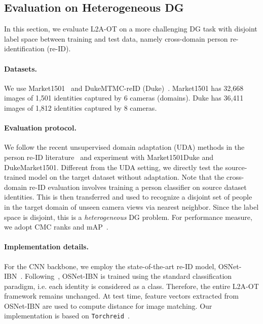 \documentclass[runningheads]{llncs}
\begin{document}
\subsection{Evaluation on Heterogeneous DG}
In this section, we evaluate L2A-OT on a more challenging DG task with disjoint label space between training and test data, namely cross-domain person re-identification (re-ID).

\paragraph{Datasets.}
We use Market1501~\cite{zheng2015scalable} and DukeMTMC-reID (Duke)~\cite{ristani2016perform,zheng2017unlabeled}. Market1501 has 32,668 images of 1,501 identities captured by 6 cameras (domains). Duke has 36,411 images of 1,812 identities captured by 8 cameras.

\paragraph{Evaluation protocol.}
We follow the recent unsupervised domain adaptation (UDA) methods in the person re-ID literature~\cite{zhong2018gen,zhong2019camstyle,liu2019adaptive} and experiment with Market1501Duke and DukeMarket1501. Different from the UDA setting, we directly test the source-trained model on the target dataset without adaptation. Note that the cross-domain re-ID evaluation involves training a person classifier on source dataset identities. This is then transferred and used to recognize a disjoint set of people in the target domain of unseen camera views via nearest neighbor. Since the label space is disjoint, this is a \emph{heterogeneous} DG problem. For performance measure, we adopt CMC ranks and mAP~\cite{zheng2015scalable}.

\paragraph{Implementation details.}
For the CNN backbone, we employ the state-of-the-art re-ID model, OSNet-IBN~\cite{zhou2019osnet,zhou2019learning}. Following~\cite{zhou2019osnet,zhou2019learning}, OSNet-IBN is trained using the standard classification paradigm, i.e. each identity is considered as a class. Therefore, the entire L2A-OT framework remains unchanged. At test time, feature vectors extracted from OSNet-IBN are used to compute  distance for image matching. Our implementation is based on \texttt{Torchreid}~\cite{torchreid}.
\end{document}
